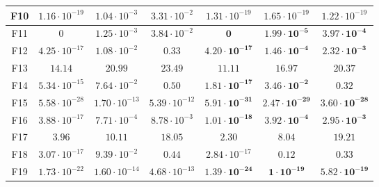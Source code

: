 \begin{table}[!t]
\begin{scriptsize}
\begin{tabular}{c || c c c | c c c }
F10 & $1.16 \cdot 10^{-19}$  & $1.04 \cdot 10^{-3}$  & $3.31 \cdot 10^{-2}$  & $1.31 \cdot 10^{-19}$ & $1.65 \cdot 10^{-19}$ & $1.22 \cdot 10^{-19}$ \\ \hline
F11 & $0$                    & $1.25 \cdot 10^{-3}$  & $3.84 \cdot 10^{-2}$  & $\mathbf{0}$                   & $\mathbf{1.99 \cdot 10^{-5}}$  & $\mathbf{3.97 \cdot 10^{-4}}$  \\ \hline
F12 & $4.25 \cdot 10^{-17}$  & $1.08 \cdot 10^{-2}$  & $0.33$                & $\mathbf{4.20 \cdot 10^{-17}}$ & $\mathbf{1.46 \cdot 10^{-4}}$  & $\mathbf{2.32 \cdot 10^{-3}}$  \\ \hline
F13 & $14.14$                & $20.99$               & $23.49$               & $\mathbf{11.11}$               & $\mathbf{16.97}$               & $\mathbf{20.37}$               \\ \hline
F14 & $5.34 \cdot 10^{-15}$  & $7.64 \cdot 10^{-2}$  & $0.50$                & $\mathbf{1.81 \cdot 10^{-17}}$ & $\mathbf{3.46 \cdot 10^{-2}}$  & $\mathbf{0.32}$                \\ \hline
F15 & $5.58 \cdot 10^{-28}$  & $1.70 \cdot 10^{-13}$ & $5.39 \cdot 10^{-12}$ & $\mathbf{5.91 \cdot 10^{-31}}$ & $\mathbf{2.47 \cdot 10^{-29}}$ & $\mathbf{3.60 \cdot 10^{-28}}$ \\ \hline
F16 & $3.88 \cdot 10^{-17}$  & $7.71 \cdot 10^{-4}$  & $8.78 \cdot 10^{-3}$  & $\mathbf{1.01 \cdot 10^{-18}}$ & $\mathbf{3.92 \cdot 10^{-4}}$  & $\mathbf{2.95 \cdot 10^{-3}}$  \\ \hline
F17 & $3.96$                 & $10.11$               & $18.05$               & $\mathbf{2.30}$                & $\mathbf{8.04}$                & $\mathbf{19.21}$               \\ \hline
F18 & $3.07 \cdot 10^{-17}$  & $9.39 \cdot 10^{-2}$  & $0.44$                & $2.84 \cdot 10^{-17}$ & $0.12$                & $0.33$                \\ \hline
F19 & $1.73 \cdot 10^{-22}$  & $1.60 \cdot 10^{-14}$ & $4.68 \cdot 10^{-13}$ & $\mathbf{1.39 \cdot 10^{-24}}$ & $\mathbf{1 \cdot 10^{-19}}$    & $\mathbf{5.82 \cdot 10^{-19}}$ \\ \hline
\end{tabular}
\end{scriptsize}
\end{table}
